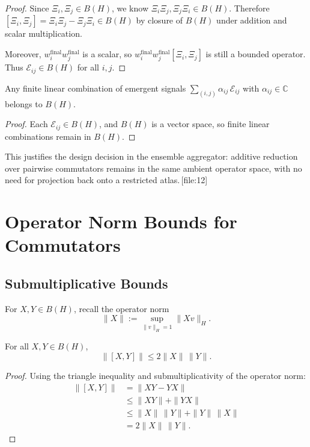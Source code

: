 \documentclass[11pt]{article}
\begin{document}
\begin{proof}
Since \(\Xi_i, \Xi_j \in B(H)\), we know \(\Xi_i\Xi_j, \Xi_j\Xi_i \in B(H)\).
Therefore \([\Xi_i,\Xi_j] = \Xi_i\Xi_j - \Xi_j\Xi_i \in B(H)\) by closure of
\(B(H)\) under addition and scalar multiplication.

Moreover, \(w_i^{\mathrm{final}} w_j^{\mathrm{final}}\) is a scalar, so
\(w_i^{\mathrm{final}} w_j^{\mathrm{final}} [\Xi_i,\Xi_j]\) is still a bounded
operator. Thus \(\mathcal{E}_{ij} \in B(H)\) for all \(i,j\).
\end{proof}

\begin{corollary}
Any finite linear combination of emergent signals
\(\sum_{(i,j)} \alpha_{ij}\,\mathcal{E}_{ij}\) with \(\alpha_{ij} \in \mathbb{C}\)
belongs to \(B(H)\).
\end{corollary}

\begin{proof}
Each \(\mathcal{E}_{ij} \in B(H)\), and \(B(H)\) is a vector space, so finite
linear combinations remain in \(B(H)\).
\end{proof}

This justifies the design decision in the ensemble aggregator: additive
reduction over pairwise commutators remains in the same ambient operator
space, with no need for projection back onto a restricted atlas.\,[file:12]

\section{Operator Norm Bounds for Commutators}

\subsection{Submultiplicative Bounds}

For \(X,Y \in B(H)\), recall the operator norm
\[
  \|X\| := \sup_{\|v\|_H = 1} \|Xv\|_H.
\]

\begin{lemma}
\label{lem:basic-commutator-bound}
For all \(X,Y \in B(H)\),
\[
  \|[X,Y]\| \le 2 \|X\|\,\|Y\|.
\]
\end{lemma}

\begin{proof}
Using the triangle inequality and submultiplicativity of the operator norm:
\begin{align*}
  \|[X,Y]\|
  &= \|XY - YX\| \\
  &\le \|XY\| + \|YX\| \\
  &\le \|X\|\,\|Y\| + \|Y\|\,\|X\| \\
  &= 2 \|X\|\,\|Y\|.
\end{align*}
\end{proof}
\end{document}
